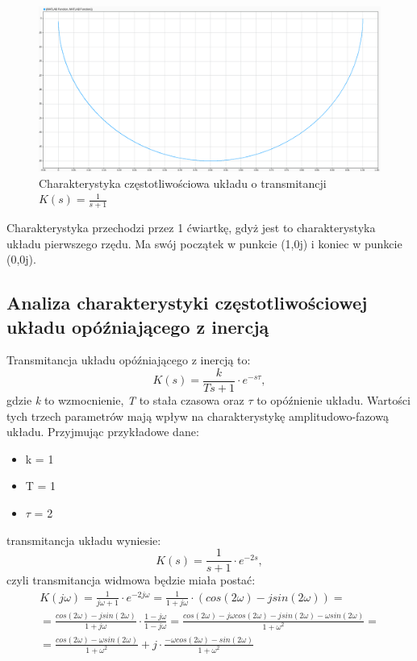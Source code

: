 \documentclass[12pt]{article}
\begin{document}
\begin{figure}[H]
    \centering
    \includegraphics[scale=0.25]{af.png}
    \caption{Charakterystyka częstotliwościowa układu o transmitancji $K(s) = \frac{1}{s+1}$ }
    \label{af}
\end{figure}

Charakterystyka przechodzi przez 1 ćwiartkę, gdyż jest to charakterystyka układu pierwszego rzędu. Ma swój początek w punkcie (1,0j) i koniec w punkcie (0,0j).

\subsection{Analiza charakterystyki częstotliwościowej układu opóźniającego z inercją}
Transmitancja układu opóźniającego z inercją to:
\begin{equation}
    K(s) = \frac{k}{Ts+1} \cdot e^{-s \tau},
\end{equation}
gdzie \textit{k} to wzmocnienie, \textit{T} to stała czasowa oraz \textit{$\tau$} to opóźnienie układu. Wartości tych trzech parametrów mają wpływ na charakterystykę amplitudowo-fazową układu. Przyjmując przykładowe dane:
\begin{itemize}
    \item k = 1
    \item T = 1
    \item $\tau$ = 2
\end{itemize}
transmitancja układu wyniesie:
\begin{equation}
    K(s) = \frac{1}{s+1} \cdot e^{-2s },
\end{equation}
czyli transmitancja widmowa będzie miała postać:
\begin{equation}
    \begin{aligned}
    K(j\omega) = \frac{1}{j\omega+1} \cdot e^{-2j\omega} = \frac{1}{1+j\omega} \cdot (cos(2\omega)-jsin(2\omega))  = \\ = \frac{cos(2\omega)-jsin(2\omega)}{1+j\omega} \cdot \frac{1-j\omega}{1-j\omega} = \frac{cos(2\omega)-j\omega cos(2\omega) - jsin(2\omega)-\omega sin(2\omega)}{1+\omega^2} = \\ = \frac{cos(2\omega) - \omega sin (2\omega)}{1+\omega^2} + j \cdot \frac{- \omega cos(2\omega)-sin(2\omega)}{1+\omega^2}
\end{aligned}
\end{equation}
\end{document}
